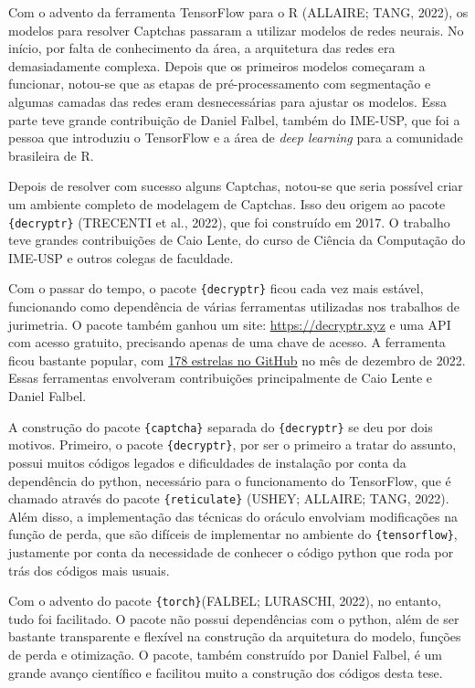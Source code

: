 \documentclass[12pt,twoside,brazilian]{book}
\begin{document}
Com o advento da ferramenta TensorFlow para o R (ALLAIRE; TANG, 2022),
os modelos para resolver Captchas passaram a utilizar modelos de redes
neurais. No início, por falta de conhecimento da área, a arquitetura das
redes era demasiadamente complexa. Depois que os primeiros modelos
começaram a funcionar, notou-se que as etapas de pré-processamento com
segmentação e algumas camadas das redes eram desnecessárias para ajustar
os modelos. Essa parte teve grande contribuição de Daniel Falbel, também
do IME-USP, que foi a pessoa que introduziu o TensorFlow e a área de
\emph{deep learning} para a comunidade brasileira de R.

Depois de resolver com sucesso alguns Captchas, notou-se que seria
possível criar um ambiente completo de modelagem de Captchas. Isso deu
origem ao pacote \texttt{\{decryptr\}} (TRECENTI et al., 2022), que foi
construído em 2017. O trabalho teve grandes contribuições de Caio Lente,
do curso de Ciência da Computação do IME-USP e outros colegas de
faculdade.

Com o passar do tempo, o pacote \texttt{\{decryptr\}} ficou cada vez
mais estável, funcionando como dependência de várias ferramentas
utilizadas nos trabalhos de jurimetria. O pacote também ganhou um site:
\url{https://decryptr.xyz} e uma API com acesso gratuito, precisando
apenas de uma chave de acesso. A ferramenta ficou bastante popular, com
\href{https://github.com/decryptr/decryptr}{178 estrelas no GitHub} no
mês de dezembro de 2022. Essas ferramentas envolveram contribuições
principalmente de Caio Lente e Daniel Falbel.

A construção do pacote \texttt{\{captcha\}} separada do
\texttt{\{decryptr\}} se deu por dois motivos. Primeiro, o pacote
\texttt{\{decryptr\}}, por ser o primeiro a tratar do assunto, possui
muitos códigos legados e dificuldades de instalação por conta da
dependência do python, necessário para o funcionamento do TensorFlow,
que é chamado através do pacote \texttt{\{reticulate\}} (USHEY; ALLAIRE;
TANG, 2022). Além disso, a implementação das técnicas do oráculo
envolviam modificações na função de perda, que são difíceis de
implementar no ambiente do \texttt{\{tensorflow\}}, justamente por conta
da necessidade de conhecer o código python que roda por trás dos códigos
mais usuais.

Com o advento do pacote \texttt{\{torch\}}(FALBEL; LURASCHI, 2022), no
entanto, tudo foi facilitado. O pacote não possui dependências com o
python, além de ser bastante transparente e flexível na construção da
arquitetura do modelo, funções de perda e otimização. O pacote, também
construído por Daniel Falbel, é um grande avanço científico e facilitou
muito a construção dos códigos desta tese.
\end{document}

